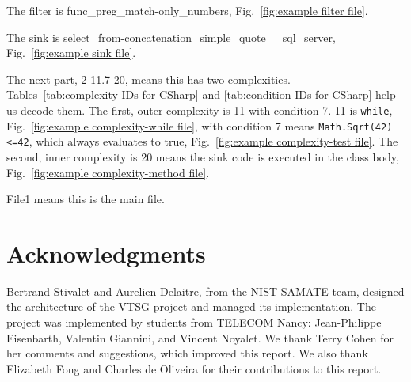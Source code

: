 \documentclass[12pt]{article}
\begin{document}
\noindent The filter is func\_preg\_match-only\_numbers,
Fig.~\ref{fig:example filter file}.

\noindent The sink is select\_from-concatenation\_simple\_quote\_\_sql\_server,
Fig.~\ref{fig:example sink file}.

\noindent The next part, 2-11.7-20, means this has two complexities.
Tables~\ref{tab:complexity IDs for CSharp} and
\ref{tab:condition IDs for CSharp} help us decode them.
The first, outer complexity is 11 with condition 7. 11 is \verb|while|,
Fig.~\ref{fig:example complexity-while file}, 
with condition 7 means \verb|Math.Sqrt(42)<=42|, which always evaluates to true,
Fig.~\ref{fig:example complexity-test file}.
The second, inner complexity is 20 means the sink code is executed in the class body,
Fig.~\ref{fig:example complexity-method file}.

\noindent File1 means this is the main file.



\section{Acknowledgments}

Bertrand Stivalet and Aurelien Delaitre, from the NIST SAMATE team, designed the
architecture of the VTSG project and managed its implementation.  The project was
implemented by students from TELECOM Nancy: Jean-Philippe Eisenbarth, Valentin
Giannini, and Vincent Noyalet.  We thank Terry Cohen for her comments and
suggestions, which improved this report.  We also thank Elizabeth Fong and
Charles de Oliveira for their contributions to this report.
%
%
%
%
\end{document}
